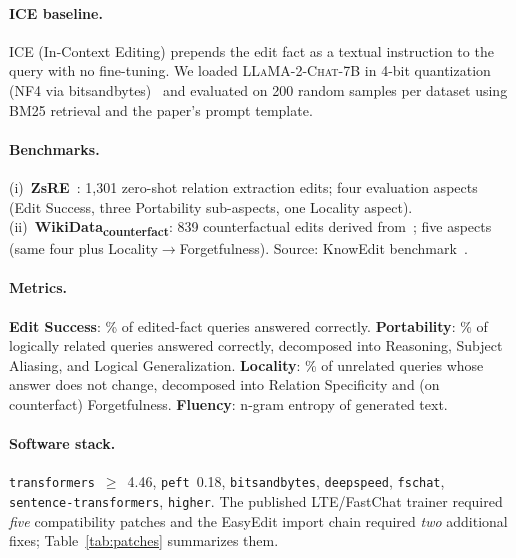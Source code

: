 \documentclass[11pt,a4paper,twocolumn]{article}
\begin{document}
\paragraph{ICE baseline.} ICE (In-Context Editing) prepends the edit fact as a textual instruction to the query with no fine-tuning. We loaded \textsc{LLaMA-2-Chat-7B} in 4-bit quantization (NF4 via bitsandbytes)~\citep{dettmers2023qlora} and evaluated on 200 random samples per dataset using BM25 retrieval and the paper's prompt template.

\paragraph{Benchmarks.} (i)~\textbf{ZsRE}~\citep{levy2017zsre}: 1{,}301 zero-shot relation extraction edits; four evaluation aspects (Edit Success, three Portability sub-aspects, one Locality aspect). (ii)~\textbf{WikiData}\textsubscript{\textbf{counterfact}}: 839 counterfactual edits derived from~\citet{cohen2023ripple}; five aspects (same four plus Locality$\rightarrow$Forgetfulness). Source: KnowEdit benchmark~\citep{zhang2024comprehensive}.

\paragraph{Metrics.} \textbf{Edit Success}: \% of edited-fact queries answered correctly. \textbf{Portability}: \% of logically related queries answered correctly, decomposed into Reasoning, Subject Aliasing, and Logical Generalization. \textbf{Locality}: \% of unrelated queries whose answer does not change, decomposed into Relation Specificity and (on counterfact) Forgetfulness. \textbf{Fluency}: n-gram entropy of generated text.

\paragraph{Software stack.} \texttt{transformers}~$\geq$~4.46, \texttt{peft}~0.18, \texttt{bitsandbytes}, \texttt{deepspeed}, \texttt{fschat}, \texttt{sentence-transformers}, \texttt{higher}. The published LTE/FastChat trainer required \emph{five} compatibility patches and the EasyEdit import chain required \emph{two} additional fixes; Table~\ref{tab:patches} summarizes them.
\end{document}
